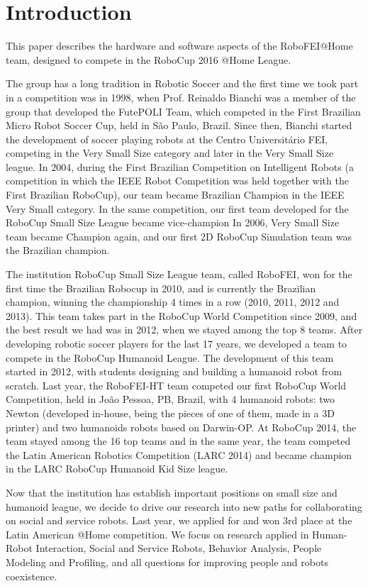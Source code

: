 \section{Introduction}

This paper describes the hardware and software aspects of the RoboFEI@Home team, designed to compete in the RoboCup 2016 @Home League.

The group has a long tradition in Robotic Soccer and the first time we took part in a competition was in 1998, when Prof. Reinaldo Bianchi was a member of the group that developed the FutePOLI Team, which competed in the First Brazilian Micro Robot Soccer Cup, held in São Paulo, Brazil. Since then, Bianchi started the development of soccer playing robots at the Centro Universitário FEI, competing in the Very Small Size category and later in the Very Small Size league. In 2004, during the First Brazilian Competition on Intelligent Robots (a competition in which the IEEE Robot Competition was held together with the First Brazilian RoboCup), our team became Brazilian Champion in the IEEE Very Small category. In the same competition, our first team developed for the RoboCup Small Size League became vice-champion In 2006, Very Small Size team became Champion again, and our first 2D RoboCup Simulation team was the Brazilian champion.

The institution RoboCup Small Size League team, called RoboFEI, won for the first time the Brazilian Robocup in 2010, and is currently the Brazilian champion, winning the championship 4 times in a row (2010, 2011, 2012 and 2013). This team takes part in the RoboCup World Competition since 2009, and the best result we had was in 2012, when we stayed among the top 8 teams. After developing robotic soccer players for the last 17 years, we developed a team to compete in the RoboCup Humanoid League. The development of this team started in 2012, with students designing and building a humanoid robot from scratch. Last year, the RoboFEI-HT team competed our first RoboCup World Competition, held in João Pessoa, PB, Brazil, with 4 humanoid robots: two Newton (developed in-house, being the pieces of one of them, made in a 3D printer) and two humanoids robots based on Darwin-OP. At RoboCup 2014, the team stayed among the 16 top teams and in the same year, the team competed the Latin American Robotics Competition (LARC 2014) and became champion in the LARC RoboCup Humanoid Kid Size league.

Now that the institution has establish important positions on small size and humanoid league, we decide to drive our research into new paths for collaborating on social and service robots. Last year, we applied for and won 3rd place at the Latin American @Home competition. We focus on research applied in Human-Robot Interaction, Social and Service Robots, Behavior Analysis, People Modeling and Profiling, and all questions for improving people and robots coexistence.
